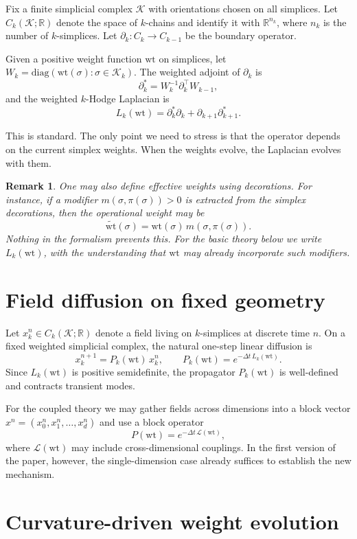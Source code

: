 \documentclass[11pt]{article}
\newtheorem{remark}[definition]{Remark}
\newcommand{\R}{\mathbb{R}}
\newcommand{\K}{\mathcal{K}}
\newcommand{\wt}{\mathrm{wt}}
\newcommand{\diag}{\mathrm{diag}}
\begin{document}
Fix a finite simplicial complex $\K$ with orientations chosen on all simplices. Let $C_k(\K;\R)$ denote the space of $k$-chains and identify it with $\R^{n_k}$, where $n_k$ is the number of $k$-simplices. Let $\partial_k:C_k\to C_{k-1}$ be the boundary operator.

Given a positive weight function $\wt$ on simplices, let $W_k=\diag(\wt(\sigma):\sigma\in \K_k)$. The weighted adjoint of $\partial_k$ is
\[
\partial_k^\ast = W_k^{-1}\partial_k^\top W_{k-1},
\]
and the weighted $k$-Hodge Laplacian is
\[
L_k(\wt)= \partial_k^\ast \partial_k + \partial_{k+1}\partial_{k+1}^\ast.
\]

This is standard. The only point we need to stress is that the operator depends on the current simplex weights. When the weights evolve, the Laplacian evolves with them.

\begin{remark}
One may also define \emph{effective weights} using decorations. For instance, if a modifier $m(\sigma,\pi(\sigma))>0$ is extracted from the simplex decorations, then the operational weight may be
\[
\widetilde{\wt}(\sigma)=\wt(\sigma)\,m(\sigma,\pi(\sigma)).
\]
Nothing in the formalism prevents this. For the basic theory below we write $L_k(\wt)$, with the understanding that $\wt$ may already incorporate such modifiers.
\end{remark}

\section{Field diffusion on fixed geometry}

Let $x_k^n\in C_k(\K;\R)$ denote a field living on $k$-simplices at discrete time $n$. On a fixed weighted simplicial complex, the natural one-step linear diffusion is
\[
x_k^{n+1}=P_k(\wt)\,x_k^n,
\qquad
P_k(\wt)=e^{-\Delta t\,L_k(\wt)}.
\]
Since $L_k(\wt)$ is positive semidefinite, the propagator $P_k(\wt)$ is well-defined and contracts transient modes.

For the coupled theory we may gather fields across dimensions into a block vector $x^n=(x_0^n,x_1^n,\dots,x_d^n)$ and use a block operator
\[
P(\wt)=e^{-\Delta t\,\mathcal{L}(\wt)},
\]
where $\mathcal{L}(\wt)$ may include cross-dimensional couplings. In the first version of the paper, however, the single-dimension case already suffices to establish the new mechanism.

\section{Curvature-driven weight evolution}
\end{document}
